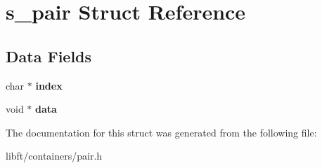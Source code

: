 \hypertarget{structs__pair}{}\section{s\+\_\+pair Struct Reference}
\label{structs__pair}
\subsection*{Data Fields}
\begin{DoxyCompactItemize}
\item 
\hypertarget{structs__pair_a494edec2064aa6d8674b9f93e226be82}{}char $\ast$ {\bfseries index}\label{structs__pair_a494edec2064aa6d8674b9f93e226be82}

\item 
\hypertarget{structs__pair_a735984d41155bc1032e09bece8f8d66d}{}void $\ast$ {\bfseries data}\label{structs__pair_a735984d41155bc1032e09bece8f8d66d}

\end{DoxyCompactItemize}


The documentation for this struct was generated from the following file\+:\begin{DoxyCompactItemize}
\item 
libft/containers/pair.\+h\end{DoxyCompactItemize}
